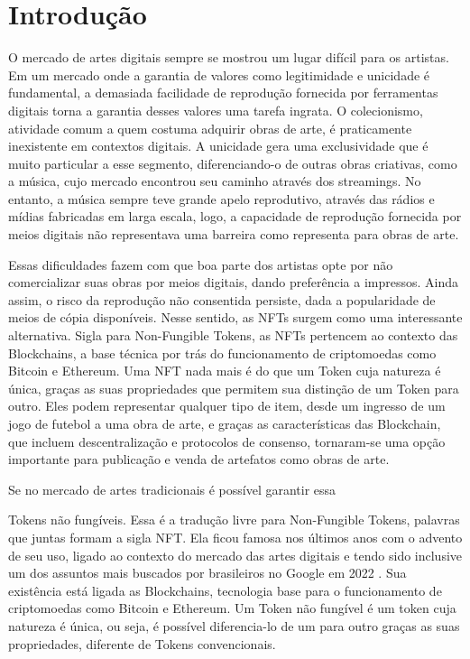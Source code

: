 \chapter{Introdução}
\label{cap:introducao}

O mercado de artes digitais sempre se mostrou um lugar difícil para os artistas. Em um mercado onde a garantia de valores como legitimidade e unicidade é fundamental, a demasiada facilidade de reprodução fornecida por ferramentas digitais torna a garantia desses valores uma tarefa ingrata. O colecionismo, atividade comum a quem costuma adquirir obras de arte, é praticamente inexistente em contextos digitais. A unicidade gera uma exclusividade que é muito particular a esse segmento, diferenciando-o de outras obras criativas, como a música, cujo mercado encontrou seu caminho através dos streamings. No entanto, a música sempre teve grande apelo reprodutivo, através das rádios e mídias fabricadas em larga escala, logo, a capacidade de reprodução fornecida por meios digitais não representava uma barreira como representa para obras de arte. 

Essas dificuldades fazem com que boa parte dos artistas opte por não comercializar suas obras por meios digitais, dando preferência a impressos. Ainda assim, o risco da reprodução não consentida persiste, dada a popularidade de meios de cópia disponíveis. Nesse sentido, as NFTs surgem como uma interessante alternativa. Sigla para Non-Fungible Tokens, as NFTs pertencem ao contexto das Blockchains, a base técnica por trás do funcionamento de criptomoedas como Bitcoin e Ethereum. Uma NFT nada mais é do que um Token cuja natureza é única, graças as suas propriedades que permitem sua distinção de um Token para outro. Eles podem representar qualquer tipo de item, desde um ingresso de um jogo de futebol a uma obra de arte, e graças as características das Blockchain, que incluem descentralização e protocolos de consenso, tornaram-se uma opção importante para publicação e venda de artefatos como obras de arte. 






Se no mercado de artes tradicionais é possível garantir essa 





Tokens não fungíveis. Essa é a tradução livre para Non-Fungible Tokens, palavras que juntas formam a sigla NFT. Ela ficou famosa nos últimos anos com o advento de seu uso, ligado ao contexto do mercado das artes digitais e tendo sido inclusive um dos assuntos mais buscados por brasileiros no Google em 2022 . Sua existência está ligada as Blockchains, tecnologia base para o funcionamento de criptomoedas como Bitcoin e Ethereum. Um Token não fungível é um token cuja natureza é única, ou seja, é possível diferencia-lo de um para outro graças as suas propriedades, diferente de Tokens convencionais. 

